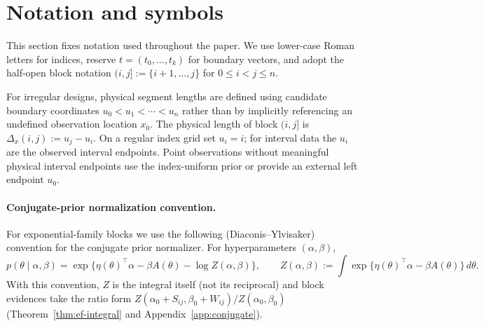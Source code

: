 \section{Notation and symbols}
\label{sec:notation}

This section fixes notation used throughout the paper. We use lower-case Roman letters for
indices, reserve $t=(t_0,\dots,t_k)$ for boundary vectors, and adopt the half-open block notation
$(i,j]:=\{i+1,\dots,j\}$ for $0\le i<j\le n$.

For irregular designs, physical segment lengths are defined using candidate boundary coordinates
$u_0<u_1<\cdots<u_n$ rather than by implicitly referencing an undefined observation location
$x_0$. The physical length of block $(i,j]$ is
$\Delta_x(i,j):=u_j-u_i$. On a regular index grid set $u_i=i$; for interval data the
$u_i$ are the observed interval endpoints. Point observations without meaningful physical interval
endpoints use the index-uniform prior or provide an external left endpoint $u_0$.

\paragraph{Conjugate-prior normalization convention.}
For exponential-family blocks we use the following (Diaconis--Ylvisaker) convention for the
conjugate prior normalizer. For hyperparameters $(\alpha,\beta)$,
\begin{equation}
p(\theta\mid \alpha,\beta)
  = \exp\{\eta(\theta)^\top \alpha - \beta A(\theta) - \log Z(\alpha,\beta)\},
\qquad
Z(\alpha,\beta)
  := \int \exp\{\eta(\theta)^\top \alpha - \beta A(\theta)\}\,d\theta.
\label{eq:Zconvention}
\end{equation}
With this convention, $Z$ is the integral itself (not its reciprocal) and block evidences take
the ratio form $Z(\alpha_0+S_{ij},\beta_0+W_{ij})/Z(\alpha_0,\beta_0)$ (Theorem~\ref{thm:ef-integral}
and Appendix~\ref{app:conjugate}).

